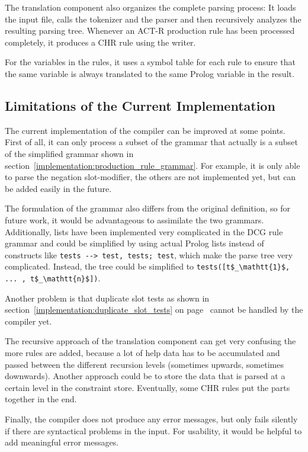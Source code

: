 The translation component also organizes the complete parsing process: It loads the input file, calls the tokenizer and the parser and then recursively analyzes the resulting parsing tree. Whenever an ACT-R production rule has been processed completely, it produces a CHR rule using the writer.

For the variables in the rules, it uses a symbol table for each rule to ensure that the same variable is always translated to the same Prolog variable in the result.

\subsection{Limitations of the Current Implementation}
\label{implementation:compiler:problems}

The current implementation of the compiler can be improved at some points. First of all, it can only process a subset of the grammar that actually is a subset of the simplified grammar shown in section~\ref{implementation:production_rule_grammar}. For example, it is only able to parse the negation slot-modifier, the others are not implemented yet, but can be added easily in the future.

The formulation of the grammar also differs from the original definition, so for future work, it would be advantageous to assimilate the two grammars. Additionally, lists have been implemented very complicated in the DCG rule grammar and could be simplified by using actual Prolog lists instead of constructs like \lstinline|tests --> test, tests; test|, which make the parse tree very complicated. Instead, the tree could be simplified to \lstinline[mathescape]|tests([t$_\mathtt{1}$, ... , t$_\mathtt{n}$])|.

Another problem is that duplicate slot tests as shown in section~\ref{implementation:duplicate_slot_tests} on page~\pageref{implementation:duplicate_slot_tests} cannot be handled by the compiler yet.

The recursive approach of the translation component can get very confusing the more rules are added, because a lot of help data has to be accumulated and passed between the different recursion levels (sometimes upwards, sometimes downwards). Another approach could be to store the data that is parsed at a certain level in the constraint store. Eventually, some CHR rules put the parts together in the end.

Finally, the compiler does not produce any error messages, but only fails silently if there are syntactical problems in the input. For usability, it would be helpful to add meaningful error messages.
